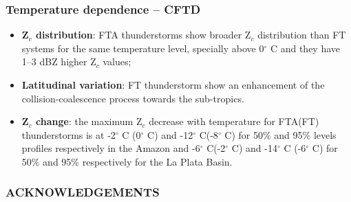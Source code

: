 \documentclass[smaller]{beamer}
\begin{document}
\begin{frame}
\frametitle{Temperature dependence -- CFTD}
\begin{itemize}
\item \textbf{Z$_c$ distribution}: FTA thunderstorms show broader Z$_c$ distribution than FT systems for the same temperature level, specially above 0$^{\circ}$ C and they have 1--3 dBZ higher Z$_c$ values;
\item \textbf{Latitudinal variation}: FT thunderstorm show an enhancement of the collision-coalescence process towards the sub-tropics.
\item  \textbf{Z$_c$ change}: the maximum Z$_c$ decrease with temperature for FTA(FT) thunderstorms is at -2$^{\circ}$ C (0$^{\circ}$ C) and -12$^{\circ}$ C(-8$^{\circ}$ C) for 50\% and 95\% levels profiles respectively in the Amazon and -6$^{\circ}$ C(-2$^{\circ}$ C) and -14$^{\circ}$ C (-6$^{\circ}$ C) for 50\% and 95\% respectively for the La Plata Basin.
\end{itemize}

\end{frame}


\begin{frame}
\frametitle{ACKNOWLEDGEMENTS}

\end{frame}
\end{document}
